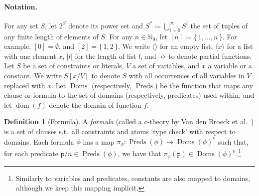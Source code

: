 \documentclass{article}
\theoremstyle{definition}
\newtheorem{definition}{Definition}
\newcommand\pfun{\mathrel{\ooalign{\hfil$\mapstochar\mkern5mu$\hfil\cr$\to$\cr}}}
\DeclareMathOperator{\dom}{dom}
\DeclareMathOperator{\Doms}{Doms}
\DeclareMathOperator{\Preds}{Preds}
\begin{document}
\paragraph{Notation.}
For any set $S$, let $2^{S}$ denote its power set and
$S^{\ast} \coloneqq \bigcup_{i=0}^{\infty} S^{i}$ the set of tuples of any
finite length of elements of $S$. For any $n \in \mathbb{N}_{0}$, let
$[n] \coloneqq \{\, 1, \dots, n \,\}$. For example, $[0] = \emptyset$, and
$[2] = \{\, 1, 2 \,\}$. We write $\langle\rangle$ for an empty list,
$\langle x \rangle$ for a list with one element $x$, $|l|$ for the length of
list $l$, and $\pfun$ to denote partial functions. Let $S$ be a set of
constraints or literals, $V$ a set of variables, and $x$ a variable or a
constant. We write $S[x/V]$ to denote $S$ with all occurrences of all variables
in $V$ replaced with $x$. Let $\Doms$ (respectively, $\Preds$) be the function
that maps any clause or formula to the set of domains (respectively, predicates)
used within, and let $\dom(f)$ denote the domain of function $f$.

\begin{definition}[Formula]\label{def:formula}
  A \emph{formula} (called a c-theory by Van den Broeck et
  al.~) is a set of clauses s.t.\ all
  constraints and atoms `type check' with respect to domains. Each formula
  $\phi$ has a map $\pi_{\phi}\colon \Preds(\phi) \to {\Doms(\phi)}^{\ast}$ such
  that, for each predicate $\texttt{p}/n \in \Preds(\phi)$, we have that
  $\pi_{\phi}(\texttt{p}) \in {\Doms(\phi)}^{n}$.\footnote{Similarly to
    variables and predicates, constants are also mapped to domains, although we
    keep this mapping implicit.}
\end{definition}
\end{document}
